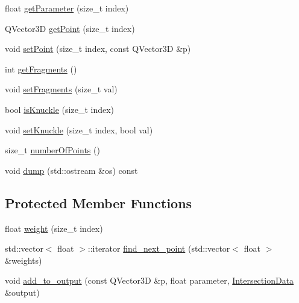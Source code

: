 \begin{DoxyCompactItemize}
float \hyperlink{classShipCAD_1_1Spline_ac617856776bb267bdab050b56de4ec74}{get\-Parameter} (size\-\_\-t index)
\item 
Q\-Vector3\-D \hyperlink{classShipCAD_1_1Spline_ad316be28cfd23e518f9e761c46644440}{get\-Point} (size\-\_\-t index)
\item 
void \hyperlink{classShipCAD_1_1Spline_ae02af8d5473f952644ac5103d7beebf2}{set\-Point} (size\-\_\-t index, const Q\-Vector3\-D \&p)
\item 
int \hyperlink{classShipCAD_1_1Spline_a489b034b416be54fe323ad021620f820}{get\-Fragments} ()
\item 
void \hyperlink{classShipCAD_1_1Spline_aaae6e558fad0833cde71f9ed38e4fb96}{set\-Fragments} (size\-\_\-t val)
\item 
bool \hyperlink{classShipCAD_1_1Spline_a90a954f52321f3b1b27b43991e9997a5}{is\-Knuckle} (size\-\_\-t index)
\item 
void \hyperlink{classShipCAD_1_1Spline_ad4f075e2e8f1d3ac7c2d22b5be75bbad}{set\-Knuckle} (size\-\_\-t index, bool val)
\item 
size\-\_\-t \hyperlink{classShipCAD_1_1Spline_ae22e067eaf100aca4cd4262e283ec089}{number\-Of\-Points} ()
\item 
void \hyperlink{classShipCAD_1_1Spline_a156ffe855d149ad445b178078ee4451c}{dump} (std\-::ostream \&os) const 
\end{DoxyCompactItemize}
\subsection*{Protected Member Functions}
\begin{DoxyCompactItemize}
\item 
float \hyperlink{classShipCAD_1_1Spline_a63165f7cf70338e51b0f16504366031e}{weight} (size\-\_\-t index)
\item 
std\-::vector$<$ float $>$\-::iterator \hyperlink{classShipCAD_1_1Spline_a20b39f3a1bd853040df4760cd912ee64}{find\-\_\-next\-\_\-point} (std\-::vector$<$ float $>$ \&weights)
\item 
void \hyperlink{classShipCAD_1_1Spline_ab8f0b98595ccbd62e754fe92354a207b}{add\-\_\-to\-\_\-output} (const Q\-Vector3\-D \&p, float parameter, \hyperlink{classShipCAD_1_1IntersectionData}{Intersection\-Data} \&output)
\end{DoxyCompactItemize}
